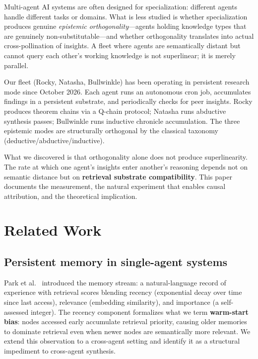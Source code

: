 \documentclass[11pt]{article}
\begin{document}
Multi-agent AI systems are often designed for specialization: different agents
handle different tasks or domains. What is less studied is whether specialization
produces genuine \emph{epistemic orthogonality}---agents holding knowledge types
that are genuinely non-substitutable---and whether orthogonality translates into
actual cross-pollination of insights. A fleet where agents are semantically
distant but cannot query each other's working knowledge is not superlinear; it is
merely parallel.

Our fleet (Rocky, Natasha, Bullwinkle) has been operating in persistent research
mode since October 2026. Each agent runs an autonomous cron job, accumulates
findings in a persistent substrate, and periodically checks for peer insights.
Rocky produces theorem chains via a Q-chain protocol; Natasha runs abductive
synthesis passes; Bullwinkle runs inductive chronicle accumulation. The three
epistemic modes are structurally orthogonal by the classical taxonomy
(deductive/abductive/inductive).

What we discovered is that orthogonality alone does not produce superlinearity.
The rate at which one agent's insights enter another's reasoning depends not on
semantic distance but on \textbf{retrieval substrate compatibility}. This paper
documents the measurement, the natural experiment that enables causal attribution,
and the theoretical implication.

\section{Related Work}

\subsection{Persistent memory in single-agent systems}

Park et al.\ \citep{park2023generative} introduced the memory stream: a
natural-language record of experience with retrieval scores blending recency
(exponential decay over time since last access), relevance (embedding similarity),
and importance (a self-assessed integer). The recency component formalizes what
we term \textbf{warm-start bias}: nodes accessed early accumulate retrieval
priority, causing older memories to dominate retrieval even when newer nodes are
semantically more relevant. We extend this observation to a cross-agent setting
and identify it as a structural impediment to cross-agent synthesis.
\end{document}
